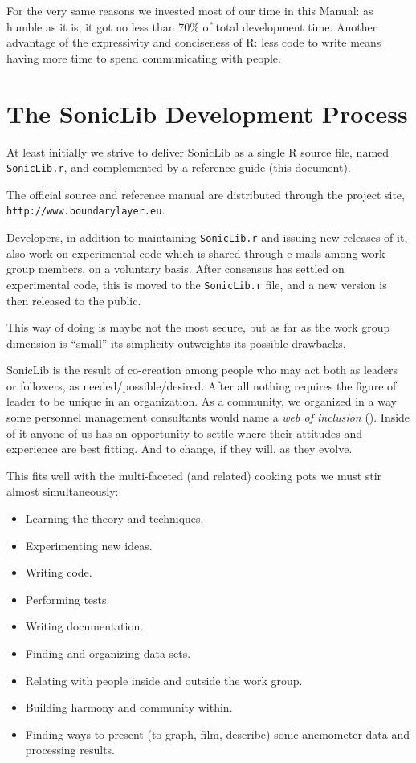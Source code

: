 \documentclass[a4paper,10pt]{book}
\begin{document}
For the very same reasons we invested most of our time in this Manual: as humble as it is, it got no less than 70\% of total development time. Another advantage of the expressivity and conciseness of R: less code to write means having more time to spend communicating with people.

\section{The SonicLib Development Process}
\label{sec:SonicLib Development Process}

At least initially we strive to deliver SonicLib as a single R source file, named \texttt{SonicLib.r}, and complemented by a reference guide (this document).

The official source and reference manual are distributed through the project site, \texttt{http://www.boundarylayer.eu}.

Developers, in addition to maintaining \texttt{SonicLib.r} and issuing new releases of it, also work on experimental code which is shared through e-mails among work group members, on a voluntary basis. After consensus has settled on experimental code, this is moved to the \texttt{SonicLib.r} file, and a new version is then released to the public.

This way of doing is maybe not the most secure, but as far as the work group dimension is ``small'' its simplicity outweights its possible drawbacks.

SonicLib is the result of co-creation among people who may act both as leaders or followers, as needed/possible/desired. After all nothing requires the figure of leader to be unique in an organization. As a community, we organized in a way some personnel management consultants would name a \emph{web of inclusion} (\cite{Helgesen1995}). Inside of it anyone of us has an opportunity to settle where their attitudes and experience are best fitting. And to change, if they will, as they evolve.

This fits well with the multi-faceted (and related) cooking pots we must stir almost simultaneously:

\begin{itemize}
 \item Learning the theory and techniques.
 \item Experimenting new ideas.
 \item Writing code.
 \item Performing tests.
 \item Writing documentation.
 \item Finding and organizing data sets.
 \item Relating with people inside and outside the work group.
 \item Building harmony and community within.
 \item Finding ways to present (to graph, film, describe) sonic anemometer data and processing results.
\end{itemize}
\end{document}
